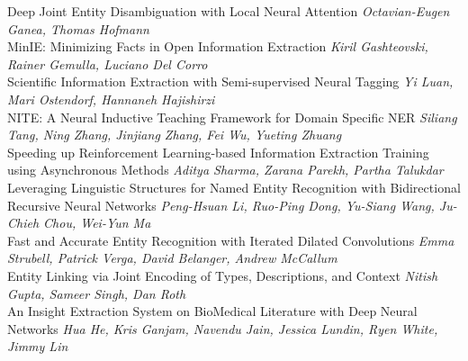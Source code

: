 \documentclass{book}
\begin{document}
    \noindent	Deep Joint Entity Disambiguation with Local Neural Attention \newline 
    {\itshape Octavian-Eugen Ganea, Thomas Hofmann} \\
    
    \noindent	MinIE: Minimizing Facts in Open Information Extraction \newline 
    {\itshape Kiril Gashteovski, Rainer Gemulla, Luciano Del Corro} \\
    
    \noindent	Scientific Information Extraction with Semi-supervised Neural Tagging \newline 
    {\itshape Yi Luan, Mari Ostendorf, Hannaneh Hajishirzi} \\
    
    \noindent	NITE: A Neural Inductive Teaching Framework for Domain Specific NER \newline 
    {\itshape Siliang Tang, Ning Zhang, Jinjiang Zhang, Fei Wu, Yueting Zhuang} \\
    
    \noindent	Speeding up Reinforcement Learning-based Information Extraction Training using Asynchronous Methods \newline 
    {\itshape Aditya Sharma, Zarana Parekh, Partha Talukdar} \\
    
    \noindent	Leveraging Linguistic Structures for Named Entity Recognition with Bidirectional Recursive Neural Networks \newline 
    {\itshape Peng-Hsuan Li, Ruo-Ping Dong, Yu-Siang Wang, Ju-Chieh Chou, Wei-Yun Ma} \\
    
    \noindent	Fast and Accurate Entity Recognition with Iterated Dilated Convolutions \newline 
    {\itshape Emma Strubell, Patrick Verga, David Belanger, Andrew McCallum} \\
    
    \noindent	Entity Linking via Joint Encoding of Types, Descriptions, and Context \newline 
    {\itshape Nitish Gupta, Sameer Singh, Dan Roth} \\
    
    \noindent	An Insight Extraction System on BioMedical Literature with Deep Neural Networks \newline 
    {\itshape Hua He, Kris Ganjam, Navendu Jain, Jessica Lundin, Ryen White, Jimmy Lin} \\
    
\end{document}
